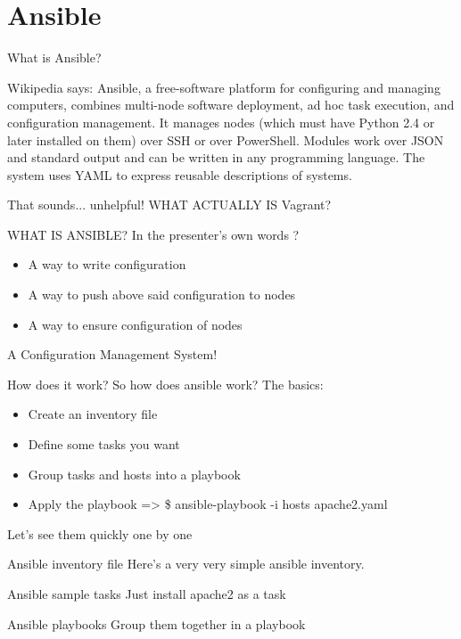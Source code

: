 \documentclass{beamer}
\begin{document}
\section{Ansible}
    \begin{frame}{What is Ansible?}
    \begin{block}{Wikipedia says:}
        Ansible, a free-software platform for configuring and managing computers, combines multi-node software deployment,
        ad hoc task execution, and configuration management. It manages nodes (which must have Python 2.4 or later installed on them)
        over SSH or over PowerShell. Modules work over JSON and standard output and can be written in any programming language.
        The system uses YAML to express reusable descriptions of systems.
    \end{block}
    \pause That sounds... unhelpful! WHAT ACTUALLY IS Vagrant?
    \end{frame}

    \begin{frame}{WHAT IS ANSIBLE?}
    In the presenter's own words ?
        \begin{itemize}
        \pause \item A way to write configuration
        \pause \item A way to push above said configuration to nodes
        \pause \item A way to ensure configuration of nodes
        \end{itemize}
    \begin{center}
        \pause A Configuration Management System!
    \end{center}
    \end{frame}

    \begin{frame}{How does it work?}
        So how does ansible work? The basics:
    \begin{itemize}
        \pause \item Create an inventory file
        \pause \item Define some tasks you want
        \pause \item Group tasks and hosts into a playbook
        \pause \item Apply the playbook =>  \$ ansible-playbook -i hosts apache2.yaml
    \end{itemize}
    \pause  Let's see them quickly one by one
    \end{frame}

    \begin{frame}{Ansible inventory file}
        Here's a very very simple ansible inventory.
        
    \end{frame}
    \begin{frame}{Ansible sample tasks}
        Just install apache2 as a task
        
    \end{frame}
    \begin{frame}{Ansible playbooks}
        Group them together in a playbook
        
    \end{frame}
\end{document}
